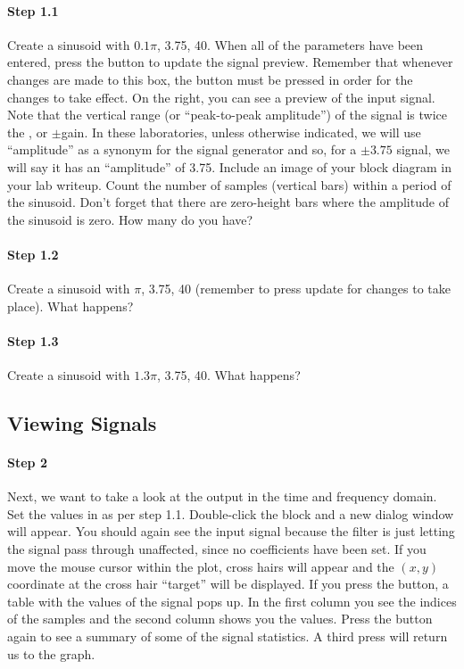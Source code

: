 \paragraph{Step 1.1} Create a sinusoid with 
$0.1\pi$,  3.75,  40. When all of the
parameters have been entered, press the  button to
update the signal preview. Remember that whenever changes are made to
this box, the  button must be pressed in order for the
changes to take effect. On the right, you can see a preview of the
input signal. Note that the vertical range (or ``peak-to-peak
amplitude'') of the signal is twice the , or
$\pm$gain. In these laboratories, unless otherwise indicated, we will
use ``amplitude'' as a synonym for the signal generator 
and so, for a $\pm3.75$ signal, we will say it has an ``amplitude'' of
3.75.  Include an image of your block diagram in your lab
writeup. Count the number of samples (vertical bars) within a period
of the sinusoid. Don't forget that there are zero-height bars where
the amplitude of the sinusoid is zero. How many do you have?

\paragraph{Step 1.2} Create a sinusoid with  $\pi$,
 3.75,  40 (remember to press
update for changes to take place). What happens?

\paragraph{Step 1.3} Create a sinusoid with 
$1.3\pi$,  3.75,  40. What
happens? 


\subsection{Viewing Signals}

\paragraph{Step 2} Next, we want to take a look at the 
output in the time and frequency domain. Set the values in  as per step 1.1.  Double-click the  block and a new
dialog window will appear. You should again see the input signal
because the filter is just letting the signal pass through unaffected,
since no coefficients have been set. If you move the mouse cursor
within the plot, cross hairs will appear and the $(x,y)$ coordinate at
the cross hair ``target'' will be displayed. If you press the
 button, a table with the values of the
signal pops up. In the first column you see the indices of the samples
and the second column shows you the values.  Press the
 button again to see a summary of some of
the signal statistics. A third press will return us to the graph.

